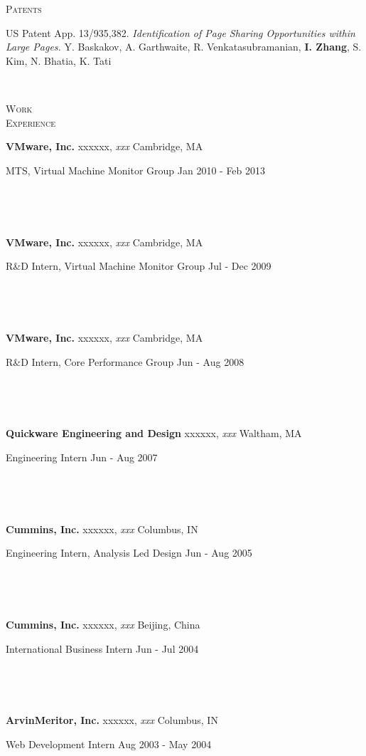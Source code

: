 \documentclass[10pt,times]{report}
\newlength{\sectiongap}
\newlength{\entrygap}
\newlength{\sectioncolwidth}
\newlength{\colgap}
\newlength{\stuffwidth}
\def\ifEqString#1#2{\def\testa{#1}\def\testb{#2}%
  \ifx\testa\testb}
\newenvironment{rtable}{
  \begin{minipage}{\textwidth}
  }{
  \end{minipage}
}
\newenvironment{rentry}[3][xxx]{
  \begin{minipage}[t]{\hsize}
    \textbf{#2}\ifEqString{#1}{xxx}\relax\else, \textit{#1}\fi
    \hspace{\stretch{1}} #3 \\
  }{
    \removelastskip
  \end{minipage}
  \\[\entrygap]  %
}
\newcommand{\rline}[2]{
  \begin{minipage}[t]{\hsize}
    #1 \hspace{\stretch{1}} #2
  \end{minipage} \\
}
\newenvironment{rsection}[1]{
  \begin{minipage}[t]{\sectioncolwidth}
    \textsc{#1}
  \end{minipage}
  \hspace{\colgap}
  \begin{minipage}[t]{\stuffwidth}
  }{
    \removelastskip
  \end{minipage}
  \\[\sectiongap]
}
\begin{document}
\begin{rtable}
\begin{rsection}{Patents}
    US Patent App. 13/935,382. \textit{Identification of Page Sharing Opportunities within Large Pages.} Y. Baskakov, A. Garthwaite, R. Venkatasubramanian, \textbf{I. Zhang}, S. Kim, N. Bhatia, K. Tati\\
  \end{rsection}
  \vspace{1.0em}
  \begin{rsection}{Work\\Experience}
    \begin{rentry}{VMware, Inc.}{Cambridge, MA}      
      \rline{MTS, Virtual Machine Monitor
        Group}{Jan 2010 - Feb 2013}
      \vspace{-.5em}
    \end{rentry}
    \begin{rentry}{VMware, Inc.}{Cambridge, MA}      
      \rline{R\&D Intern, Virtual Machine Monitor Group}{Jul - Dec 2009}
      \vspace{-.5em}
    \end{rentry}
    \begin{rentry}{VMware, Inc.}{Cambridge, MA}      
      \rline{R\&D Intern, Core Performance Group}{Jun - Aug 2008}
      \vspace{-.5em}
    \end{rentry}
    \begin{rentry}{Quickware Engineering and Design}{Waltham, MA}
      \rline{Engineering Intern}{Jun - Aug 2007} 
      \vspace{-.5em}
    \end{rentry}
    \begin{rentry}{Cummins, Inc.}{Columbus, IN}
      \rline{Engineering Intern, Analysis Led Design}{Jun - Aug 2005}
      \vspace{-.5em}
    \end{rentry}
    \begin{rentry}{Cummins, Inc.}{Beijing, China}
      \rline{International Business Intern}{Jun - Jul 2004} 
      \vspace{-.5em}
    \end{rentry}
    \begin{rentry}{ArvinMeritor, Inc.}{Columbus, IN}
      \rline{Web Development Intern}{Aug 2003 - May 2004}
      \vspace{-.5em}
    \end{rentry}
  \end{rsection}
\end{rtable}
\end{document}
